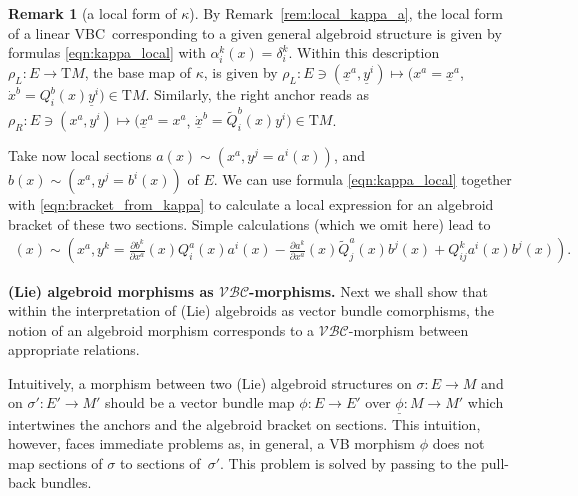 \documentclass[10pt,a4paper]{amsart}
\newcommand{\ZM}{{VBC}} %
\newcommand{\Zakrzewski}{{vector bundle comorphism}}
\newcommand{\wt}[1]{\widetilde{#1}} %
\newcommand{\und}{\underline}
\newcommand{\pa}{\partial}
\newcommand{\ra}{\rightarrow}
\newcommand{\rhoL}{\rho_L} %
\newcommand{\rhoR}{\rho_R}
\newcommand{\T}{\mathrm{T}} %
\newcommand{\catZM}{{\mathcal{VBC}}} %
\numberwithin{equation}{section}
\theoremstyle{definition}
\newtheorem{rem}[thm]{Remark}
\begin{document}
\begin{rem}[a local form of $\kappa$] By Remark~\ref{rem:local_kappa_a}, the local form of a linear \ZM\ corresponding to a given general algebroid structure is given by formulas \eqref{eqn:kappa_local} with $\alpha^k_i(x) = \delta^k_i$. Within this description $\rhoL\colon E\ra \T M$, the base map of $\kappa$, is given by $\rhoL\colon E\ni(\und{x}^a,\und{y}^i)\longmapsto(x^a=\und{x}^a$, $\dot x^b=Q^b_i(x)\und{y}^i)\in\T M$. Similarly, the right anchor reads as $\rhoR\colon E\ni(x^a,y^i)\longmapsto(\und{x}^a=x^a$, $\dot{\und{x}}^b=\wt{Q}^b_i(x)y^i)\in\T M$.

Take now local sections $a(x)\sim(x^a,y^j=a^i(x))$, and $b(x)\sim(x^a,y^j=b^i(x))$ of $E$. We can use formula \eqref{eqn:kappa_local} together with \eqref{eqn:bracket_from_kappa} to calculate a local expression for an algebroid bracket of these two sections. Simple calculations (which we omit here) lead to
\begin{gather*} [a,b](x)\sim\left(x^a,y^k=\frac{\pa b^k}{\pa x^a}(x)Q^a_i(x)a^i(x)-\frac{\pa a^k}{\pa x^a}(x)\wt{Q}^a_j(x)b^j(x)+Q^k_{ij}a^i(x)b^j(x)\right).\end{gather*}
\end{rem}

{\bf (Lie) algebroid morphisms as $\boldsymbol{\catZM}$-morphisms.} Next we shall show that within the interpretation of (Lie) algebroids as \Zakrzewski s, the notion of an algebroid morphism corresponds to a $\catZM$-morphism between appropriate relations.

Intuitively, a morphism between two (Lie) algebroid structures on $\sigma\colon E\ra M$ and on \mbox{$\sigma'\colon E'\ra M'$} should be a vector bundle map $\phi\colon E\ra E'$ over $\und{\phi}\colon M\ra M'$ which intertwines the anchors and the algebroid bracket on sections. This intuition, however, faces immediate problems as, in general, a VB morphism $\phi$ does not map sections of $\sigma$ to sections of~$\sigma'$. This problem is solved by passing to the pull-back bundles.
\end{document}
